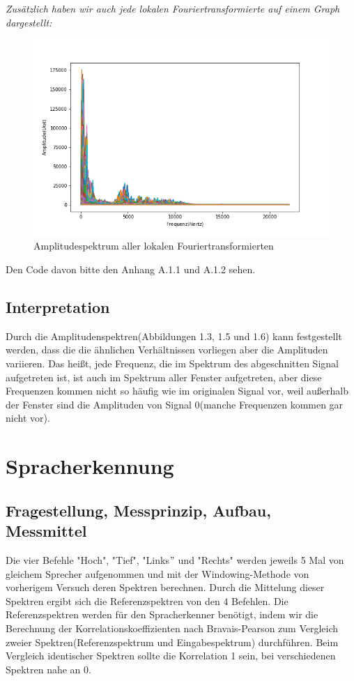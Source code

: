 \documentclass[12pt, oneside, a4paper, \docLanguage]{report}
\begin{document}
\textit{Zusätzlich haben wir auch jede lokalen Fouriertransformierte auf einem Graph dargestellt: }

\begin{figure}[H]
	\centering\small
	\includegraphics[width=12cm]{spektrum_gesamter_windowsv1.png}
	\caption{Amplitudespektrum aller lokalen Fouriertransformierten}
\end{figure}


Den Code davon bitte den Anhang A.1.1 und A.1.2 sehen.

\section{Interpretation}
\label{chap:VERSUCH_1_INTERPRETATION}
Durch die Amplitudenspektren(Abbildungen 1.3, 1.5 und 1.6) kann festgestellt werden, dass die die ähnlichen Verhältnissen vorliegen aber die Amplituden variieren. Das heißt, jede Frequenz, die im Spektrum des abgeschnitten Signal aufgetreten ist, ist auch im Spektrum aller Fenster aufgetreten, aber diese Frequenzen kommen nicht so häufig wie im originalen Signal vor, weil außerhalb der Fenster sind die Amplituden von Signal 0(manche Frequenzen kommen gar nicht vor).


%
%
\chapter{Spracherkennung}
\section{Fragestellung, Messprinzip, Aufbau, Messmittel}
\qquad Die vier Befehle "Hoch", "Tief", "Links$"$ und "Rechts" werden jeweils 5 Mal von gleichem Sprecher aufgenommen und mit der Windowing-Methode von vorherigem Versuch deren Spektren berechnen. Durch die Mittelung dieser Spektren ergibt sich die Referenzspektren von den 4 Befehlen. Die Referenzspektren werden für den Spracherkenner benötigt, indem wir die Berechnung der Korrelationskoeffizienten nach Bravais-Pearson zum Vergleich zweier Spektren(Referenzspektrum und Eingabespektrum) durchführen. Beim Vergleich identischer Spektren sollte die Korrelation 1 sein, bei verschiedenen Spektren nahe an 0. 
\end{document}
